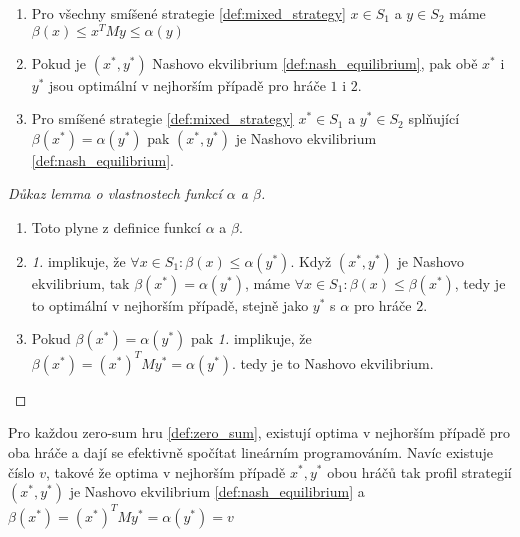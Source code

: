 \begin{theorem}
\label{thm:lemma_alpha_beta}
\begin{enumerate}
    \item Pro všechny smíšené strategie \ref{def:mixed_strategy} $x \in S_1$ a $y \in S_2$ máme $\beta(x) \leq x^T M y\leq \alpha(y)$ 
    \item Pokud je $(x^*, y^*)$ Nashovo ekvilibrium \ref{def:nash_equilibrium}, pak obě $x^*$ i $y^*$ jsou optimální v nejhorším případě pro hráče $1$ i $2$. 
    \item Pro smíšené strategie \ref{def:mixed_strategy} $x^* \in S_1$ a $y^* \in S_2$ splňující $\beta(x^*) = \alpha(y^*)$ pak $(x^*, y^*)$ je Nashovo ekvilibrium \ref{def:nash_equilibrium}.
\end{enumerate}
\end{theorem}
\begin{proof}[Důkaz lemma o vlastnostech funkcí $\alpha$ a $\beta$]
\begin{enumerate}
    \item Toto plyne z definice funkcí $\alpha$ a $\beta$. 
    \item \textit{1.} implikuje, že $\forall x \in S_1: \beta(x) \leq \alpha(y^*)$. Když $(x^*, y^*)$ je Nashovo ekvilibrium, tak $\beta(x^*) = \alpha(y^*)$, máme $\forall x \in S_1: \beta(x) \leq \beta(x^*)$, tedy je to optimální v nejhorším případě, stejně jako $y^*$ s $\alpha$ pro hráče $2$.
    \item Pokud $\beta(x^*) = \alpha(y^*)$ pak \textit{1.} implikuje, že $\beta(x^*) = (x^*)^T M y^* = \alpha(y^*)$. tedy je to Nashovo ekvilibrium. 
\end{enumerate}
\end{proof}

\begin{theorem}
\label{thm:minimax}
Pro každou zero-sum hru \ref{def:zero_sum}, existují optima v nejhorším případě pro oba hráče a dají se efektivně spočítat lineárním programováním. 
Navíc existuje číslo $v$, takové že optima v nejhorším případě $x^*, y^*$ obou hráčů tak profil strategií $(x^*, y^*)$ je Nashovo ekvilibrium \ref{def:nash_equilibrium} a $\beta(x^*) = (x^*)^T M y^* = \alpha(y^*) = v$ 
\end{theorem}

